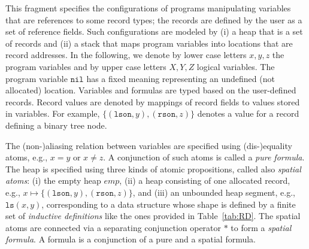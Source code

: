\documentclass[twoside,11pt]{article}
\newcommand{\posep}{*}
\newcommand{\points}{\mapsto}
\newcommand{\nil}{\mathtt{nil}}
\newcommand{\ls}{\mathtt{ls}}
\begin{document}
This fragment specifies the configurations of programs manipulating variables that are references to some record types; the records are defined by the user as a set of reference fields.
Such configurations are modeled by
(i) a heap that is a set of records and
(ii) a stack that maps program variables into locations that are record addresses.
%
In the following, we denote by lower case letters $x,y,z$ the program variables and by upper case letters $X,Y,Z$ logical variables. The program variable $\nil$ has a fixed meaning representing an undefined (not allocated) location.
%
Variables and formulas are typed based on the user-defined records. Record values are denoted by mappings of record fields to values stored in variables. For example, $\{(\texttt{lson},y), (\texttt{rson},z)\}$ denotes a value for a record defining a binary tree node.

The (non-)aliasing relation between variables are specified using (dis-)equality atoms, e.g., $x = y$ or $x\neq z$. A conjunction of such atoms is called a \emph{pure formula}. 
%
The heap is specified using three kinds of atomic propositions, called also \emph{spatial atoms}:
(i) the empty heap $\mathit{emp}$, 
(ii) a heap consisting of one allocated record, e.g., $x \points \{(\texttt{lson},y), (\texttt{rson},z)\}$,
and
(iii) an unbounded heap segment, e.g., $\ls(x,y)$, corresponding to a data structure whose shape is defined by a finite set of \emph{inductive definitions} like the ones provided in Table~\ref{tab:RD}. 
The spatial atoms are connected via a separating conjunction operator $\posep$ to form a \emph{spatial formula}. 
A formula is a conjunction of a pure and a spatial formula.
\end{document}
